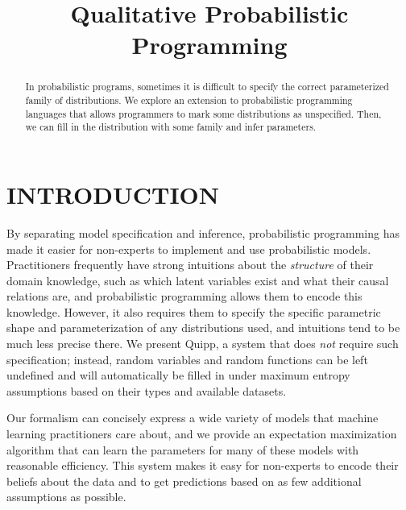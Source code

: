 \documentclass[proceed]{article}
\title{Qualitative Probabilistic Programming}
\author {}
\begin{document}
  \maketitle

  \begin{abstract}
    In probabilistic programs, sometimes it is difficult to specify the correct
    parameterized family of distributions.  We explore an extension to
    probabilistic programming languages that allows programmers to mark some
    distributions as unspecified.  Then, we can fill in the distribution with
    some family and infer parameters.
  \end{abstract}

  \section{INTRODUCTION}

  By separating model specification and inference, probabilistic programming 
  has made it easier for non-experts to implement and use probabilistic models.
  Practitioners frequently have strong intuitions about the {\em structure}
  of their domain knowledge, such as which latent variables exist and what
  their causal relations are, and probabilistic programming allows them to encode
  this knowledge. However, it also requires them to specify the specific parametric
  shape  and parameterization of any distributions used, and intuitions tend to
  be much less precise there.
  We present Quipp, a system that does {\em not} require such specification;
  instead, random variables and random functions can be left undefined
  and will automatically be filled in under maximum entropy assumptions
  based on their types and available datasets.
  
  Our formalism can concisely express a wide variety of models that machine
  learning practitioners care about, and we provide an expectation
  maximization algorithm that can learn the parameters for many of
  these models with reasonable efficiency. This system makes it easy
  for non-experts to encode their beliefs about the data and to get
  predictions based on as few additional assumptions as possible.
  
\end{document}
